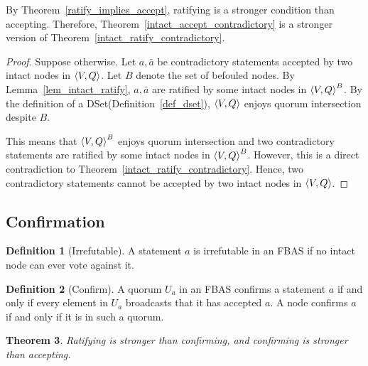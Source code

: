 \documentclass[12pt, psamsfonts]{amsart}
\newtheorem{thm}{Theorem}[subsection]
\theoremstyle{definition}
\newtheorem{defn}[thm]{Definition}
\theoremstyle{remark}
\numberwithin{equation}{subsection}
\begin{document}
By Theorem~\ref{ratify_implies_accept}, ratifying is a stronger condition than accepting.
Therefore, Theorem~\ref{intact_accept_contradictory} is a stronger version of Theorem~\ref{intact_ratify_contradictory}.

\begin{proof}
    Suppose otherwise.
    Let $a, \bar{a}$ be contradictory statements accepted by two intact nodes in $\ev{V, Q}$.
    Let $B$ denote the set of befouled nodes.
    By Lemma~\ref{lem_intact_ratify}, $a, \bar{a}$ are ratified by some intact nodes in $\ev{V, Q}^B$.
    By the definition of a DSet(Definition~\ref{def_dset}), $\ev{V, Q}$ enjoys quorum intersection despite $B$.

    This means that $\ev{V, Q}^B$ enjoys quorum intersection and two contradictory statements are ratified by some intact nodes in $\ev{V, Q}^B$.
    However, this is a direct contradiction to Theorem~\ref{intact_ratify_contradictory}.
    Hence, two contradictory statements cannot be accepted by two intact nodes in $\ev{V, Q}$.
\end{proof}

\newpage
\subsection{Confirmation}

\begin{defn}[Irrefutable]\label{def_irrefutable}
    A statement $a$ is irrefutable in an FBAS if no intact node can ever vote against it.
\end{defn}

\begin{defn}[Confirm]\label{def_confirm}
    A quorum $U_a$ in an FBAS confirms a statement $a$ if and only if every element in $U_a$ broadcasts that it has accepted $a$.
    A node confirms $a$ if and only if it is in such a quorum.
\end{defn}

\begin{thm}\label{ratify_confirm_accept}
    Ratifying is stronger than confirming, and confirming is stronger than accepting.
\end{thm}
\end{document}

